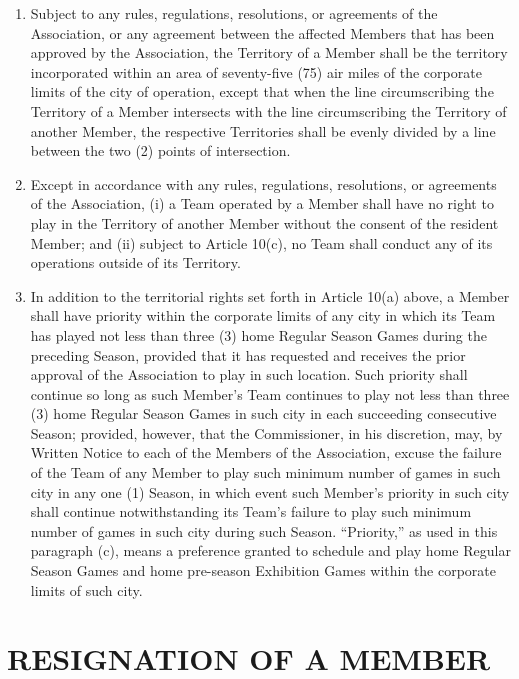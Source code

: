 \documentclass[]{book}
\providecommand{\tightlist}{%
  \setlength{\itemsep}{0pt}\setlength{\parskip}{0pt}}
\theoremstyle{definition}
\theoremstyle{definition}
\theoremstyle{definition}
\theoremstyle{remark}
\begin{document}
\begin{enumerate}
\def\labelenumi{(\alph{enumi})}
\tightlist
\item
  Subject to any rules, regulations, resolutions, or agreements of the
  Association, or any agreement between the affected Members that has
  been approved by the Association, the Territory of a Member shall be
  the territory incorporated within an area of seventy-five (75) air
  miles of the corporate limits of the city of operation, except that
  when the line circumscribing the Territory of a Member intersects with
  the line circumscribing the Territory of another Member, the
  respective Territories shall be evenly divided by a line between the
  two (2) points of intersection.
\item
  Except in accordance with any rules, regulations, resolutions, or
  agreements of the Association, (i) a Team operated by a Member shall
  have no right to play in the Territory of another Member without the
  consent of the resident Member; and (ii) subject to Article 10(c), no
  Team shall conduct any of its operations outside of its Territory.
\item
  In addition to the territorial rights set forth in Article 10(a)
  above, a Member shall have priority within the corporate limits of any
  city in which its Team has played not less than three (3) home Regular
  Season Games during the preceding Season, provided that it has
  requested and receives the prior approval of the Association to play
  in such location. Such priority shall continue so long as such
  Member's Team continues to play not less than three (3) home Regular
  Season Games in such city in each succeeding consecutive Season;
  provided, however, that the Commissioner, in his discretion, may, by
  Written Notice to each of the Members of the Association, excuse the
  failure of the Team of any Member to play such minimum number of games
  in such city in any one (1) Season, in which event such Member's
  priority in such city shall continue notwithstanding its Team's
  failure to play such minimum number of games in such city during such
  Season. ``Priority,'' as used in this paragraph (c), means a
  preference granted to schedule and play home Regular Season Games and
  home pre-season Exhibition Games within the corporate limits of such
  city.
\end{enumerate}

\section{RESIGNATION OF A MEMBER}\label{resignation-of-a-member}
\end{document}
